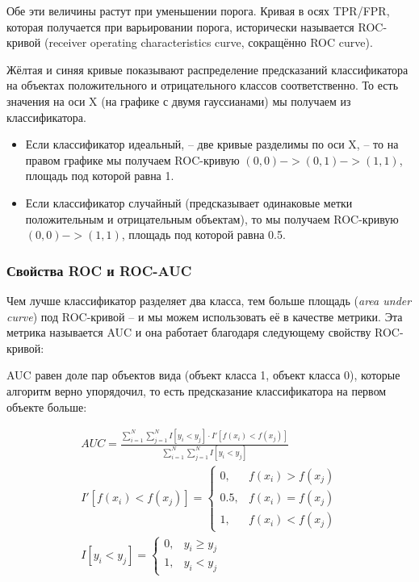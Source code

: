 Обе эти величины растут при уменьшении порога.
Кривая в осях TPR/FPR, которая получается при варьировании порога, исторически называется ROC-кривой (receiver
operating characteristics curve, сокращённо ROC curve).

Жёлтая и синяя кривые показывают распределение предсказаний классификатора на объектах положительного и
отрицательного классов соответственно.
То есть значения на оси X (на графике с двумя гауссианами) мы получаем из классификатора.

\begin{itemize}
    \item Если классификатор идеальный, -- две кривые разделимы по оси X, -- то на правом графике мы получаем
    ROC-кривую $(0,0)->(0,1)->(1,1)$, площадь под которой равна 1.
    \item Если классификатор случайный (предсказывает одинаковые метки положительным и отрицательным объектам), то
    мы получаем ROC-кривую $(0,0)->(1,1)$, площадь под которой равна 0.5.
\end{itemize}

\subsubsection{Свойства ROC и ROC-AUC}
Чем лучше классификатор разделяет два класса, тем больше площадь (\textit{area under curve}) под ROC-кривой -- и
мы можем использовать её в качестве метрики.
Эта метрика называется AUC и она работает благодаря следующему свойству ROC-кривой:

AUC равен доле пар объектов вида (объект класса 1, объект класса 0), которые алгоритм верно упорядочил, то есть
предсказание классификатора на первом объекте больше:

\begin{gather*}
    AUC = \frac{\sum\limits_{i=1}^N \sum\limits_{j=1}^N I[y_i < y_j] \cdot I'[f(x_i) < f(x_j)]}{\sum\limits_{i=1}^N
    \sum\limits_{j=1}^N I[y_i < y_j]} \\
    I'[f(x_i) < f(x_j)] =
    \begin{cases}
        0, & f(x_i) > f(x_j) \\
        0.5, & f(x_i) = f(x_j) \\
        1, & f(x_i) < f(x_j)
    \end{cases}\\
    I[y_i < y_j] =
    \begin{cases}
        0, & y_i \geq y_j \\
        1, & y_i < y_j
    \end{cases} \\
\end{gather*}

